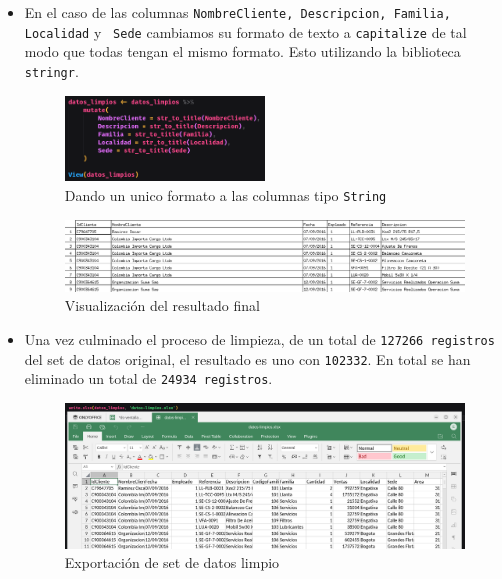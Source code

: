 \documentclass[12pt]{article}
\begin{document}
\begin{itemize}
                
                \item En el caso de las columnas \texttt{NombreCliente, Descripcion, Familia, Localidad} y \texttt{ Sede} cambiamos su formato de texto a \texttt{capitalize} de tal modo que todas tengan el mismo formato. Esto utilizando la biblioteca \texttt{stringr}.
                    \newpage    
                    \begin{figure}[h]
                        \centering 
                        \includegraphics[width=0.5\textwidth]{img/limpieza-12.png}
                        \caption{Dando un unico formato a las columnas tipo \texttt{String}}
                    \end{figure}

                    \begin{figure}[h]
                        \centering 
                        \includegraphics[width=1\textwidth]{img/limpieza-13.png}
                        \caption{Visualización del resultado final}
                    \end{figure}
                
                \item Una vez culminado el proceso de limpieza, de un total de \texttt{127266 registros} del set de datos original, el resultado es uno con \texttt{102332}. En total se han eliminado un total de \texttt{24934 registros}.
                    \begin{figure}[h]
                        \centering 
                        \includegraphics[width=1\textwidth]{img/limpieza-14.png}
                        \caption{Exportación de set de datos limpio}
                    \end{figure}
            
            \end{itemize}
\end{document}

